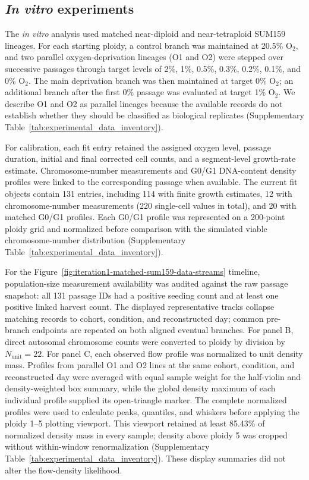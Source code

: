 \documentclass[11pt]{article}
\begin{document}
\subsection{\textit{In vitro} experiments}
\label{invitro}

The \textit{in vitro} analysis used matched near-diploid and near-tetraploid SUM159 lineages. For each starting ploidy, a control branch was maintained at 20.5\% O$_2$, and two parallel oxygen-deprivation lineages (O1 and O2) were stepped over successive passages through target levels of 2\%, 1\%, 0.5\%, 0.3\%, 0.2\%, 0.1\%, and 0\% O$_2$. The main deprivation branch was then maintained at target 0\% O$_2$; an additional branch after the first 0\% passage was evaluated at target 1\% O$_2$. We describe O1 and O2 as parallel lineages because the available records do not establish whether they should be classified as biological replicates (Supplementary Table~\ref{tab:experimental_data_inventory}).

For calibration, each fit entry retained the assigned oxygen level, passage duration, initial and final corrected cell counts, and a segment-level growth-rate estimate. Chromosome-number measurements and G0/G1 DNA-content density profiles were linked to the corresponding passage when available. The current fit objects contain 131 entries, including 114 with finite growth estimates, 12 with chromosome-number measurements (220 single-cell values in total), and 20 with matched G0/G1 profiles. Each G0/G1 profile was represented on a 200-point ploidy grid and normalized before comparison with the simulated viable chromosome-number distribution (Supplementary Table~\ref{tab:experimental_data_inventory}).

For the Figure~\ref{fig:iteration1-matched-sum159-data-streams} timeline, population-size measurement availability was audited against the raw passage snapshot: all 131 passage IDs had a positive seeding count and at least one positive linked harvest count. The displayed representative tracks collapse matching records to cohort, condition, and reconstructed day; common pre-branch endpoints are repeated on both aligned eventual branches. For panel B, direct autosomal chromosome counts were converted to ploidy by division by $N_{\mathrm{unit}}=22$. For panel C, each observed flow profile was normalized to unit density mass. Profiles from parallel O1 and O2 lines at the same cohort, condition, and reconstructed day were averaged with equal sample weight for the half-violin and density-weighted box summary, while the global density maximum of each individual profile supplied its open-triangle marker. The complete normalized profiles were used to calculate peaks, quantiles, and whiskers before applying the ploidy 1--5 plotting viewport. This viewport retained at least 85.43\% of normalized density mass in every sample; density above ploidy 5 was cropped without within-window renormalization (Supplementary Table~\ref{tab:experimental_data_inventory}). These display summaries did not alter the flow-density likelihood.
\end{document}
